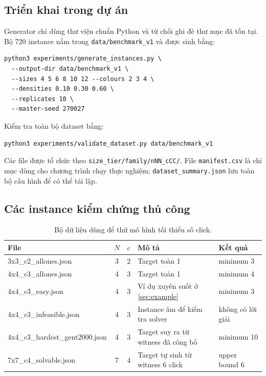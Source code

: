 \documentclass[11pt,a4paper]{article}
\begin{document}
\subsection{Triển khai trong dự án}

Generator chỉ dùng thư viện chuẩn Python và từ chối ghi đè thư mục đã tồn
tại. Bộ 720 instance nằm trong \texttt{data/benchmark\_v1} và được sinh bằng:

\begin{lstlisting}[style=jsonstyle,language={}]
python3 experiments/generate_instances.py \
  --output-dir data/benchmark_v1 \
  --sizes 4 5 6 8 10 12 --colours 2 3 4 \
  --densities 0.10 0.30 0.60 \
  --replicates 10 \
  --master-seed 270027
\end{lstlisting}

Kiểm tra toàn bộ dataset bằng:

\begin{lstlisting}[style=jsonstyle,language={}]
python3 experiments/validate_dataset.py data/benchmark_v1
\end{lstlisting}

Các file được tổ chức theo
\texttt{size\_tier/family/nNN\_cCC/}. File \texttt{manifest.csv} là chỉ mục dùng
cho chương trình chạy thực nghiệm; \texttt{dataset\_summary.json} lưu toàn
bộ cấu hình để có thể tái lập.

\subsection{Các instance kiểm chứng thủ công}

\begin{table}[H]
\centering
\caption{Bộ dữ liệu dùng để thử mô hình tối thiểu số click.}
\label{tab:dataset}
\footnotesize
\begin{tabularx}{\textwidth}{@{}>{\ttfamily}l c c X l@{}}
\toprule
\normalfont\textbf{File} & $N$ & $c$ &
\normalfont\textbf{Mô tả} & \normalfont\textbf{Kết quả} \\
\midrule
3x3\_c2\_allones.json
&3&2&Target toàn 1&minimum 3\\
4x4\_c3\_allones.json
&4&3&Target toàn 1&minimum 4\\
4x4\_c3\_easy.json
&4&3&Ví dụ xuyên suốt ở \cref{sec:example}&minimum 3\\
4x4\_c3\_infeasible.json
&4&3&Instance âm để kiểm tra solver&không có lời giải\\
4x4\_c3\_hardest\_gent2000.json
&4&3&Target suy ra từ witness đã công bố&minimum 10
\cite{gent2000symmetry}\\
7x7\_c4\_solvable.json
&7&4&Target tự sinh từ witness 6 click&upper bound 6\\
\bottomrule
\end{tabularx}
\end{table}
\end{document}
